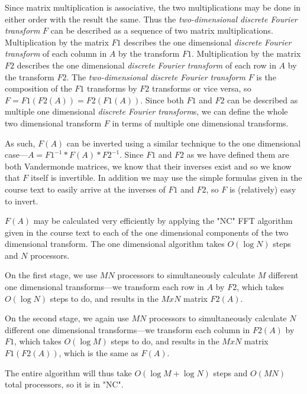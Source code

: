 \documentclass{article}
\begin{document}
\begin{enumerate}
\par Since matrix multiplication is associative, the two multiplications may be done in either order with the result the same. Thus the \emph{two-dimensional discrete Fourier transform} $F$ can be described as a sequence of two matrix multiplications. Multiplication by the matrix $F1$ describes the one dimensional \emph{discrete Fourier transform} of each column in $A$ by the transform $F1$. Multiplication by the matrix $F2$ describes the one dimensional \emph{discrete Fourier transform} of each row in $A$ by the transform $F2$. The \emph{two-dimensional discrete Fourier transform} $F$ is the composition of the $F1$ transforms by $F2$ transforms or vice versa, so $F = F1(F2(A)) = F2(F1(A))$. Since both $F1$ and $F2$ can be described as multiple one dimensional \emph{discrete Fourier transform}s, we can define the whole two dimensional transform $F$ in terms of multiple one dimensional transforms.

\par As such, $F(A)$ can be inverted using a similar technique to the one dimensional case---$A = F1^{-1} * F(A) * F2^{-1}$.  Since $F1$ and $F2$ as we have defined them are both Vandermonde matrices, we know that their inverses exist and so we know that $F$ itself is invertible.  In addition we may use the simple formulas given in the course text to easily arrive at the inverses of $F1$ and $F2$, so $F$ is (relatively) easy to invert. 

\par $F(A)$ may be calculated very efficiently by applying the "NC" FFT algorithm given in the course text to each of the one dimensional components of the two dimensional transform. The one dimensional algorithm takes $O(\log N)$ steps and $N$ processors.

\par On the first stage, we use $MN$ processors to simultaneously calculate $M$ different one dimensional transforms---we transform each row in $A$ by $F2$, which takes $O(\log N)$ steps to do, and results in the $M x N$ matrix $F2(A)$.

\par On the second stage, we again use $MN$ processors to simultaneously calculate $N$ different one dimensional transforms---we transform each column in $F2(A)$ by $F1$, which takes $O(\log M)$ steps to do, and results in the $M x N$ matrix $F1(F2(A))$, which is the same as $F(A)$.

\par The entire algorithm will thus take $O(\log M + \log N)$ steps and $O(MN)$ total processors, so it is in "NC".




\end{enumerate}
\end{document}

